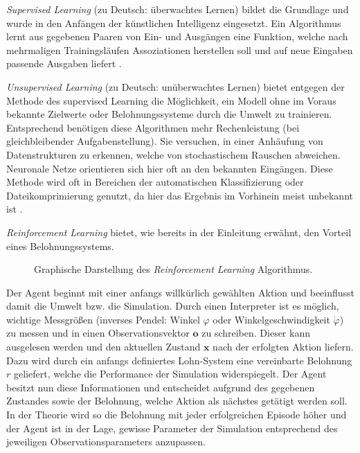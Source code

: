 	\textit{Supervised Learning} (zu Deutsch: überwachtes Lernen) bildet die Grundlage und wurde in den Anfängen der künstlichen Intelligenz eingesetzt. Ein Algorithmus lernt aus gegebenen Paaren von Ein- und Ausgängen eine Funktion, welche nach mehrmaligen Trainingsläufen Assoziationen herstellen soll und auf neue Eingaben passende Ausgaben liefert \cite{DeepLearning}.
	
	\textit{Unsupervised Learning} (zu Deutsch: unüberwachtes Lernen) bietet entgegen der Methode des supervised Learning die Möglichkeit, ein Modell ohne im Voraus bekannte Zielwerte oder Belohnungssysteme durch die Umwelt zu trainieren. Entsprechend benötigen diese Algorithmen mehr Rechenleistung (bei gleichbleibender Aufgabenstellung). Sie versuchen, in einer Anhäufung von Datenstrukturen zu erkennen, welche von stochastischem Rauschen abweichen. Neuronale Netze orientieren sich hier oft an den bekannten Eingängen. Diese Methode wird oft in Bereichen der automatischen Klassifizierung oder Dateikomprimierung genutzt, da hier das Ergebnis im Vorhinein meist unbekannt ist \cite{DeepLearning}.
	
	\textit{Reinforcement Learning} bietet, wie bereits in der Einleitung erwähnt, den Vorteil eines Belohnungssystems.
	\begin{figure}[H] %
		\centering
		\def\svgwidth{12cm}
		
		\caption{Graphische Darstellung des \textit{Reinforcement Learning} Algorithmus.}
		\label{fig:rl_chart}
	\end{figure}
	Der Agent beginnt mit einer anfangs willkürlich gewählten Aktion und beeinflusst damit die Umwelt bzw. die Simulation. Durch einen Interpreter ist es möglich, wichtige Messgrößen (inverses Pendel: Winkel $\varphi$ oder Winkelgeschwindigkeit $\dot{\varphi}$) zu messen und in einen Observationsvektor $\boldsymbol{o}$ zu schreiben. Dieser kann ausgelesen werden und den aktuellen Zustand $\boldsymbol{x}$ nach der erfolgten Aktion liefern. Dazu wird durch ein anfangs definiertes Lohn-System eine vereinbarte Belohnung $r$ geliefert, welche die Performance der Simulation widerspiegelt. Der Agent besitzt nun diese Informationen und entscheidet aufgrund des gegebenen Zustandes sowie der Belohnung, welche Aktion als nächstes getätigt werden soll. In der Theorie wird so die Belohnung mit jeder erfolgreichen Episode höher und der Agent ist in der Lage, gewisse Parameter der Simulation entsprechend des jeweiligen Observationsparameters anzupassen.
	
